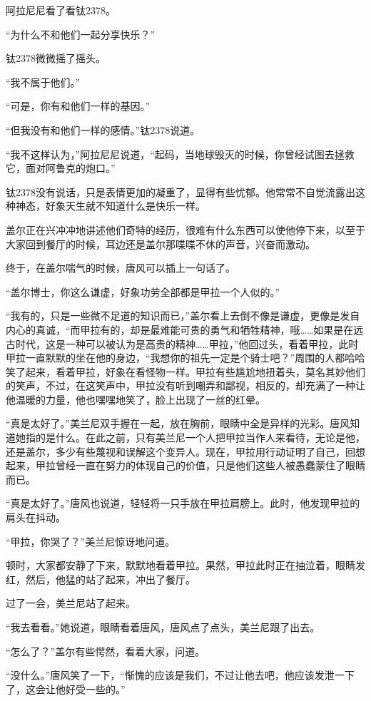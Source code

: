 阿拉尼尼看了看钛2378。 

“为什么不和他们一起分享快乐？” 

钛2378微微摇了摇头。 

“我不属于他们。” 

“可是，你有和他们一样的基因。” 

“但我没有和他们一样的感情。”钛2378说道。 

“我不这样认为，”阿拉尼尼说道，“起码，当地球毁灭的时候，你曾经试图去拯救它，面对阿鲁克的炮口。” 

钛2378没有说话，只是表情更加的凝重了，显得有些忧郁。他常常不自觉流露出这种神态，好象天生就不知道什么是快乐一样。 

盖尔正在兴冲冲地讲述他们奇特的经历，很难有什么东西可以使他停下来，以至于大家回到餐厅的时候，耳边还是盖尔那喋喋不休的声音，兴奋而激动。 

终于，在盖尔喘气的时候，唐风可以插上一句话了。 

“盖尔博士，你这么谦虚，好象功劳全部都是甲拉一个人似的。” 

“我有的，只是一些微不足道的知识而已，”盖尔看上去倒不像是谦虚，更像是发自内心的真诚，“而甲拉有的，却是最难能可贵的勇气和牺牲精神，哦……如果是在远古时代，这是一种可以被认为是高贵的精神……甲拉，”他回过头，看着甲拉，此时甲拉一直默默的坐在他的身边，“我想你的祖先一定是个骑士吧？”周围的人都哈哈笑了起来，看着甲拉，好象在看怪物一样。甲拉有些尴尬地扭着头，莫名其妙他们的笑声，不过，在这笑声中，甲拉没有听到嘲弄和鄙视，相反的，却充满了一种让他温暖的力量，他也嘿嘿地笑了，脸上出现了一丝的红晕。 

“真是太好了。”美兰尼双手握在一起，放在胸前，眼睛中全是异样的光彩。唐风知道她指的是什么。在此之前，只有美兰尼一个人把甲拉当作人来看待，无论是他，还是盖尔，多少有些蔑视和误解这个变异人。现在，甲拉用行动证明了自己，回想起来，甲拉曾经一直在努力的体现自己的价值，只是他们这些人被愚蠢蒙住了眼睛而已。 

“真是太好了。”唐风也说道，轻轻将一只手放在甲拉肩膀上。此时，他发现甲拉的肩头在抖动。 

“甲拉，你哭了？”美兰尼惊讶地问道。 

顿时，大家都安静了下来，默默地看着甲拉。果然，甲拉此时正在抽泣着，眼睛发红，然后，他猛的站了起来，冲出了餐厅。 

过了一会，美兰尼站了起来。 

“我去看看。”她说道，眼睛看着唐风，唐风点了点头，美兰尼跟了出去。 

“怎么了？”盖尔有些愕然，看着大家，问道。 

“没什么。”唐风笑了一下，“惭愧的应该是我们，不过让他去吧，他应该发泄一下了，这会让他好受一些的。” 

